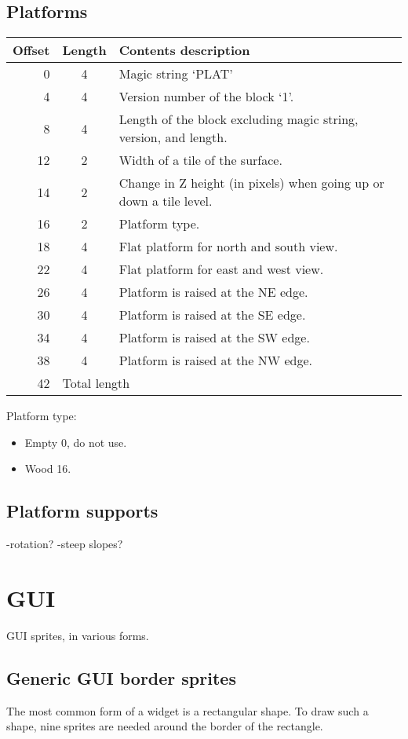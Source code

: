 \documentclass{article}
\begin{document}
\subsection{Platforms}
\begin{center}
\begin{tabular}{|r|c|l|} \hline
\textbf{Offset} & \textbf{Length} & \textbf{Contents description} \\ \hline
   0 &  4 & Magic string `PLAT' \\
   4 &  4 & Version number of the block `1'. \\
   8 &  4 & Length of the block excluding magic string, version, and length. \\
  12 &  2 & Width of a tile of the surface. \\
  14 &  2 & Change in Z height (in pixels) when going up or down a tile level. \\
  16 &  2 & Platform type. \\
  18 &  4 & Flat platform for north and south view. \\
  22 &  4 & Flat platform for east and west view. \\
  26 &  4 & Platform is raised at the NE edge. \\
  30 &  4 & Platform is raised at the SE edge. \\
  34 &  4 & Platform is raised at the SW edge. \\
  38 &  4 & Platform is raised at the NW edge. \\ \hline
  42 & \multicolumn{2}{l|}{Total length} \\ \hline
\end{tabular}
\end{center}

Platform type:
\begin{itemize}
\item Empty 0, do not use.
\item Wood 16.
\end{itemize}


\subsection{Platform supports}
-rotation?
-steep slopes?

\section{GUI}
GUI{} sprites, in various forms.

\subsection{Generic GUI{} border sprites}
The most common form of a widget is a rectangular shape.
To draw such a shape, nine sprites are needed around the border of the
rectangle.
\end{document}
